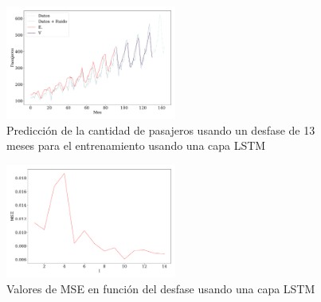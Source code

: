 \begin{figure}
	\begin{small}
		\begin{center}
			\includegraphics[width=0.5\textwidth]{prediccion_l-12.pdf}
		\end{center}
		\caption{Predicción de la cantidad de pasajeros usando un desfase de 13 meses para el entrenamiento usando una capa LSTM}
		\label{fig:l-13-LSTM}
	\end{small}
\end{figure}
\vfill \null 
\begin{figure}[H]
	\begin{small}
		\begin{center}
			\includegraphics[width=0.5\textwidth]{barrido_en_l.pdf}
		\end{center}
		\caption{Valores de MSE en función del desfase usando una capa LSTM}
		\label{fig:barrido_en_l}
	\end{small}
\end{figure}
